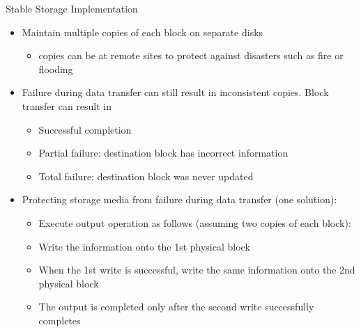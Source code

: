 \documentclass[aspectratio=169, xcolor=dvipsnames]{beamer}
\begin{document}
\begin{frame}{Stable Storage Implementation}
    \begin{itemize}[<+->]
        \item Maintain multiple copies of each block on separate disks
        \begin{itemize}
            \item[$\triangleright$] copies can be at remote sites to protect against disasters such as fire or flooding
        \end{itemize}
        \item Failure during data transfer can still result in inconsistent copies. Block transfer can result in
        \begin{itemize}
            \item[$\triangleright$] Successful completion
            \item[$\triangleright$] Partial failure: destination block has incorrect information
            \item[$\triangleright$] Total failure: destination block was never updated
        \end{itemize}
        \item Protecting storage media from failure during data transfer (one solution):
        \begin{itemize}
            \item[$\triangleright$] Execute output operation as follows (assuming two copies of each block):
            \item[$\triangleright$] Write the information onto the 1st physical block
            \item[$\triangleright$] When the 1st write is successful, write the same information onto the 2nd physical block
            \item[$\triangleright$] The output is completed only after the second write successfully completes
        \end{itemize}
    \end{itemize}
\end{frame}
\end{document}
